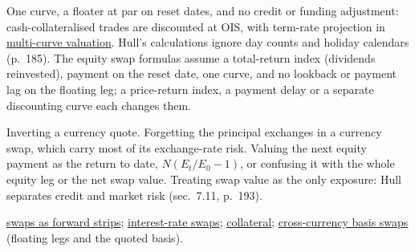 \begin{qfmethod}
 One curve, a floater at par on reset dates, and no credit or funding adjustment: cash-collateralised trades are discounted at OIS, with term-rate projection in \hyperref[mod:multi-curve-fra-swap-valuation]{multi-curve valuation}. Hull's calculations ignore day counts and holiday calendars (p.~185). The equity swap formulas assume a total-return index (dividends reinvested), payment on the reset date, one curve, and no lookback or payment lag on the floating leg; a price-return index, a payment delay or a separate discounting curve each changes them.

 Inverting a currency quote. Forgetting the principal exchanges in a currency swap, which carry most of its exchange-rate risk. Valuing the next equity payment as the return to date, $N(E_t/E_0-1)$, or confusing it with the whole equity leg or the net swap value. Treating swap value as the only exposure: Hull separates credit and market risk (sec.~7.11, p.~193).

 \hyperref[def:swaps-as-forward-strips]{swaps as forward strips}; \hyperref[def:interest-rate-swaps]{interest-rate swaps}; \hyperref[mech:otc-clearing-collateral]{collateral}; \hyperref[meth:cross-currency-basis-swaps]{cross-currency basis swaps} (floating legs and the quoted basis).

\end{qfmethod}

